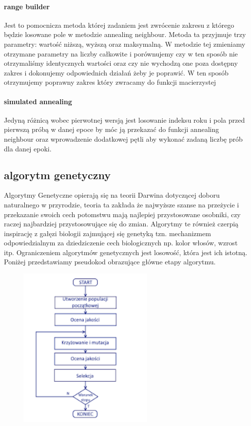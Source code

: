 \documentclass{article}
\begin{document}
 \paragraph{range builder}
 Jest to pomocnicza metoda której zadaniem jest zwrócenie zakresu z którego będzie losowane pole w metodzie annealing neighbour. Metoda ta przyjmuje trzy parametry: wartość niższą, wyższą oraz maksymalną. W metodzie tej zmieniamy otrzymane parametry na liczby całkowite i porównujemy czy w ten sposób nie otrzymaliśmy identycznych wartości oraz czy nie wychodzą one poza dostępny zakres i dokonujemy odpowiednich działań żeby je poprawić. W ten sposób otrzymujemy poprawny zakres który zwracamy do funkcji macierzystej

\paragraph{simulated annealing}
Jedyną różnicą wobec pierwotnej wersją jest losowanie indeksu roku i pola przed pierwszą próbą w danej epoce by móc ją przekazać do funkcji annealing neighbour oraz wprowadzenie dodatkowej pętli aby wykonać zadaną liczbę prób dla danej epoki.

\subsection{algorytm genetyczny}
Algorytmy Genetyczne opierają się na teorii Darwina dotyczącej doboru naturalnego w przyrodzie, teoria ta zakłada że najwyższe szanse na przeżycie i przekazanie swoich cech potomstwu mają najlepiej przystosowane osobniki, czy raczej najbardziej przystosowujące się do zmian. Algorytmy te również czerpią inspirację z gałęzi biologii zajmującej się genetyką tzn. mechanizmem odpowiedzialnym za dziedziczenie cech biologicznych np. kolor włosów, wzrost itp.
Ograniczeniem algorytmów genetycznych jest losowość, która jest ich istotną. Poniżej przedstawiamy pseudokod obrazujące główne etapy algorytmu.

\begin{figure}[h]
        \centering
        \includegraphics[width=0.6\textwidth]{screens/genetic_pseudocode.png}
        \label{fig:paneloperatorski}
\end{figure}
\newpage
\end{document}
